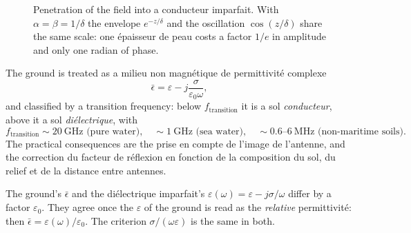 \begin{figure}[h!]
  \centering
  \caption*{\small Penetration of the field into a conducteur imparfait. With
  $\alpha = \beta = 1/\delta$ the envelope $e^{-z/\delta}$ and the oscillation
  $\cos(z/\delta)$ share the same scale: one épaisseur de peau costs a factor
  $1/e$ in amplitude and only one radian of phase.}
\end{figure}

\begin{example}
  The ground is treated as a milieu non magnétique de permittivité
  complexe
  \[
    \bar{\epsilon} = \varepsilon - j\frac{\sigma}{\varepsilon_0\omega},
  \]
  and classified by a transition frequency: below $f_{\text{transition}}$
  it is a sol \emph{conducteur}, above it a sol \emph{diélectrique},
  with
  \[
    f_{\text{transition}} \sim 20~\text{GHz (pure water)},\quad
    \sim 1~\text{GHz (sea water)},\quad
    \sim 0.6\text{--}6~\text{MHz (non-maritime soils)} .
  \]
  The practical consequences are the prise en compte de l'image de l'antenne,
  and the correction du facteur de réflexion en fonction de la composition
  du sol, du relief et de la distance entre antennes.
\end{example}

\begin{remark}
  The ground's $\bar{\epsilon}$ and the diélectrique imparfait's
  $\varepsilon(\omega) = \varepsilon - j\sigma/\omega$ differ by a factor
  $\varepsilon_0$. They agree once the $\varepsilon$ of the ground is read as
  the \emph{relative} permittivité: then
  $\bar{\epsilon} = \varepsilon(\omega)/\varepsilon_0$. The criterion
  $\sigma/(\omega\varepsilon)$ is the same in both.
\end{remark}

